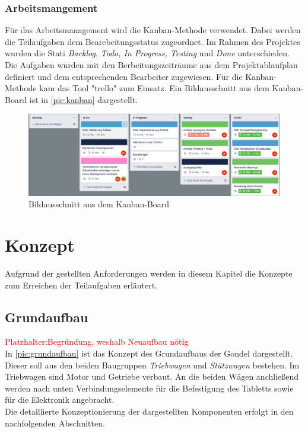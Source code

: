 \newpage
\subsection{Arbeitsmangement}
\label{sec:arbeitsmanagement}
Für das Arbeitsmanagement wird die Kanban-Methode verwendet. Dabei werden die Teilaufgaben dem Bearebeitungsstatus zugeordnet. Im Rahmen des Projektes wurden die Stati \textit{Backlog}, \textit{Todo,  In Progress, Testing} und \textit{Done}  unterschieden. Die Aufgaben wurden mit den Berbeitungszeiträume aus dem Projektablaufplan definiert und dem entsprechenden Bearbeiter zugewiesen. 	
Für die Kanban-Methode kam das Tool "trello" zum Einsatz. Ein Bildausschnitt aus dem Kanban-Board ist in \autoref{pic:kanban} dargestellt. 


\begin{figure}[h] %
	\includegraphics[width=17cm]{kanban.png}
	\caption{Bildausschnitt aus dem Kanban-Board}
	\label{pic:kanban}
\end{figure}


\chapter{Konzept}
Aufgrund der gestellten Anforderungen werden in diesem Kapitel die Konzepte zum Erreichen der Teilaufgaben erläutert. \newpage

\section{Grundaufbau}
\textcolor{red}{Platzhalter:Begründung, weshalb Neuaufbau nötig}\\
In  \autoref{pic:grundaufbau} ist das Konzept des Grundaufbaus der Gondel dargestellt. Dieser soll aus den beiden Baugruppen \textit{Triebwagen} und \textit{Stützwagen} bestehen. Im Triebwagen sind Motor und Getriebe verbaut. An die beiden Wägen anchließend werden nach unten Verbindungselemente für die Befestigung des Tabletts sowie für die Elektronik angebracht. \\
Die detaillierte Konzeptionierung der dargestellten Komponenten erfolgt in den nachfolgenden Abschnitten. 


